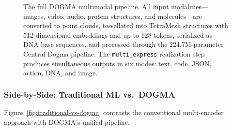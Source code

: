 \begin{figure}[ht]
\caption{The full DOGMA multimodal pipeline. All input modalities---images, video, audio, protein structures, and molecules---are converted to point clouds, tessellated into TetraMesh structures with 512-dimensional embeddings and up to 128 tokens, serialized as DNA base sequences, and processed through the 224.7M-parameter Central Dogma pipeline. The \texttt{multi\_express} realization step produces simultaneous outputs in six modes: text, code, JSON, action, DNA, and image.}
\label{fig:multimodal-pipeline}
\end{figure}

\subsubsection{Side-by-Side: Traditional ML vs.\ DOGMA}

Figure~\ref{fig:traditional-vs-dogma} contrasts the conventional multi-encoder approach with DOGMA's unified pipeline.

